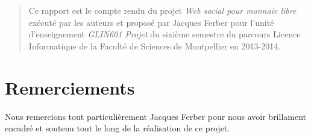 \maketitle

\begin{abstract}
Ce rapport est le compte rendu du projet \emph{Web social pour monnaie libre} exécuté par les auteurs et proposé par Jacques Ferber pour l'unité d'enseignement \emph{GLIN601 Projet} du sixième semestre du parcours Licence Informatique de la Faculté de Sciences de Montpellier en 2013-2014.
\end{abstract}

\chapter*{Remerciements}
Nous remercions tout particulièrement Jacques Ferber pour nous avoir brillament encadré et soutenu tout le long de la réalisation de ce projet.

\tableofcontents























\appendix






